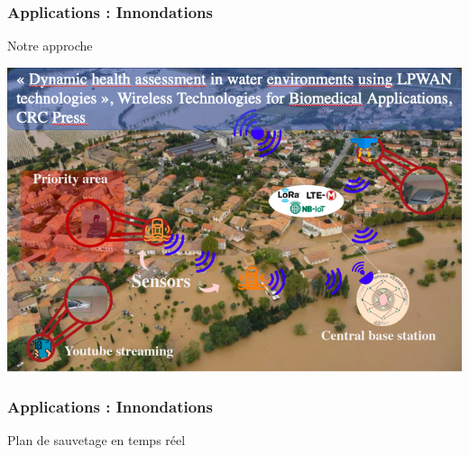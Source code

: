 \begin{frame}
	\frametitle{Applications : Innondations}
	\vspace{0.3cm}
	\begin{block}{}
		\centering
		\Large Notre approche
	\end{block}
	\vspace{0.2cm}
	\centering
	\includegraphics[scale=0.35]{Files/fig/scenaioLORA21.png}
\end{frame}
\begin{frame}
	\frametitle{Applications : Innondations}
	\begin{block}{}
		\centering
		\Large Plan de sauvetage en temps réel
	\end{block}
	\vspace{0.5cm}
	\centering
\end{frame}


